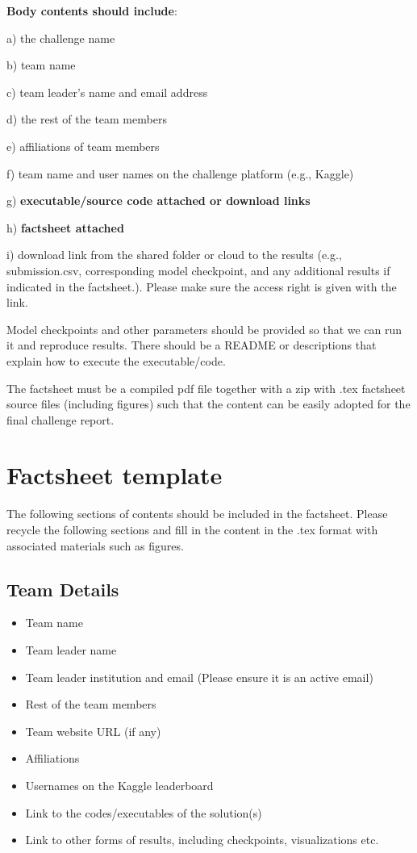 \documentclass{article}
\begin{document}
\textbf{Body contents should include}: 

a) the challenge name 

b) team name 

c) team leader's name and email address 

d) the rest of the team members 

e) affiliations of team members

f) team name and user names on the challenge platform (e.g., Kaggle) 

g) \textbf{executable/source code attached or download links}

h) \textbf{factsheet attached} 

i) download link from the shared folder or cloud to the results (e.g., submission.csv, corresponding model checkpoint, and any additional results if indicated in the factsheet.). Please make sure the access right is given with the link.

Model checkpoints and other parameters should be provided so that we can run it and reproduce results. There should be a README or descriptions that explain how to execute the executable/code. 

The factsheet must be a compiled pdf file together with a zip with .tex factsheet source files (including figures) such that the content can be easily adopted for the final challenge report. 


\section{Factsheet template}
The following sections of contents should be included in the factsheet. Please recycle the following sections and fill in the content in the .tex format with associated materials such as figures.

\subsection{Team Details}

\begin{itemize}
    \item Team name
    \item Team leader name
    \item Team leader institution and email (Please ensure it is an active email)
    \item Rest of the team members
    \item Team website URL (if any)
    \item Affiliations
    \item Usernames on the Kaggle leaderboard 
    \item Link to the codes/executables of the solution(s)
    \item Link to other forms of results, including checkpoints, visualizations etc.
\end{itemize}
\end{document}
